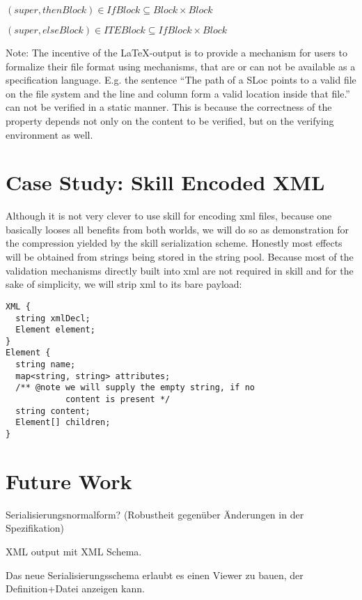 \documentclass[a4paper,10pt]{article}
\begin{document}
$(super, thenBlock) \in IfBlock \subseteq Block \times Block$

$(super, elseBlock) \in ITEBlock \subseteq IfBlock \times Block$

Note: The incentive of the \LaTeX-output is to provide a mechanism for users to formalize their file format using mechanisms, that are or can not be available as a specification language. E.g. the sentence ``The path of a SLoc points to a valid file on the file system and the line and column form a valid location inside that file.'' can not be verified in a static manner. This is because the correctness of the property depends not only on the content to be verified, but on the verifying environment as well.

\section{Case Study: Skill Encoded XML}
Although it is not very clever to use skill for encoding xml files, because one basically looses all benefits from both worlds, we will do so as demonstration for the compression yielded by the skill serialization scheme. Honestly most effects will be obtained from strings being stored in the string pool. Because most of the validation mechanisms directly built into xml are not required in skill and for the sake of simplicity, we will strip xml to its bare payload:
\begin{lstlisting}[label=sex,caption=Skill Encoded XML]
XML {
  string xmlDecl;
  Element element;
}
Element {
  string name;
  map<string, string> attributes;
  /** @note we will supply the empty string, if no
            content is present */
  string content;
  Element[] children;
}
\end{lstlisting}


\section{Future Work}

Serialisierungsnormalform? (Robustheit gegenüber Änderungen in der Spezifikation)

XML output mit XML Schema.

Das neue Serialisierungsschema erlaubt es einen Viewer zu bauen, der Definition+Datei anzeigen kann.
\end{document}
